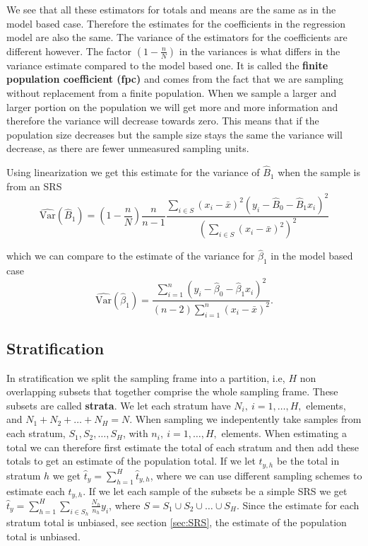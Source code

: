 \documentclass{article}
\begin{document}
We see that all these estimators for totals and means are the same as in the
model based case. Therefore the estimates for the coefficients in the regression
model are also the same. The variance of the estimators for the coefficients are
different however.
The factor \(\left( 1 - \frac{n}{N} \right)\) in the variances is what differs in
the variance estimate compared to the model based one. It is called the
\textbf{finite population coefficient (fpc)} and comes from the fact that we are
sampling without replacement from a finite population.
When we sample a larger and larger portion on the population we will get more
and more information and therefore the variance will decrease towards zero.
This means that if the population size decreases but the sample size stays the
same the variance will decrease, as there are fewer unmeasured sampling units.

Using linearization we get this estimate for the variance of \(\hat{B}_1\) when
the sample is from an SRS\begin{equation*}
\widehat{\mathrm{Var}}(\hat{B}_1) = \left( 1 - \frac{n}{N} \right) \frac{n}{n - 1} \frac{\sum_{i \in S} \left( x_i - \bar{x} \right)^2 \left( y_i - \hat{B}_0 - \hat{B}_1 x_i \right)^2}
{\left( \sum_{i \in S} \left( x_i - \bar{x} \right)^2 \right)^2}
\end{equation*}

which we can compare to the estimate of the variance for \(\hat{\beta}_1\) in
the model based case
\begin{equation*}
 \widehat{\mathrm{Var}} \left( \hat{\beta}_1 \right) = \frac{\sum_{i = 1}^n\left( y_i - \hat{\beta}_0 -
 \hat{\beta}_1 x_i \right)^2}{
   \left( n - 2 \right)\sum_{i = 1}^n \left( x_i - \bar{x} \right)^2}.
\end{equation*}


\subsection{Stratification} \label{sec:strat}

In stratification we split the sampling frame into a partition, i.e, \(H\) non
overlapping subsets that together comprise the whole sampling frame. These
subsets are called \textbf{strata}. We let each stratum have \(N_i,\ i = 1, \dots
, H,\) elements, and \(N_1 + N_2 + \dots + N_H = N\). When sampling we
indepentently take samples from each stratum, \(S_1, S_2, \dots, S_H\), with \(n_i,\ i = 1, \dots
, H,\) elements. When
estimating a total we can therefore first estimate the total of each stratum and
then add these totals to get an estimate of the population total.
If we let \(t_{y,h}\) be the total in stratum \(h\) we get \(\hat{t}_y =
\sum_{h = 1}^H \hat{t}_{y, h} \), where we can use different sampling schemes to
estimate each \(t_{y, h}\).
If we let each sample of the subsets be a simple SRS we get \( \hat{t}_y =
\sum_{h = 1}^H\sum_{i \in S_h}\frac{N_h}{n_h}y_i\),
where \(S = S_1 \cup S_2 \cup \dots \cup S_H\).
Since the estimate for each
stratum total is unbiased, see section \ref{sec:SRS}, the estimate of the population
total is unbiased.
\end{document}
